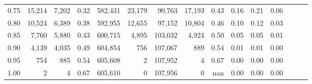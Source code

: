 \begin{tabular}{rrrrrrrrrrrrrrr}
0.75 &  15,214 &   7,202 &  0.32 &  582,431 &   23,179 &   90,763 &   17,193 &  0.43 &  0.16 &  0.21 &      0.06 \\
0.80 &  10,524 &   6,389 &  0.38 &  592,955 &   12,655 &   97,152 &   10,804 &  0.46 &  0.10 &  0.12 &      0.03 \\
0.85 &   7,760 &   5,880 &  0.43 &  600,715 &    4,895 &  103,032 &    4,924 &  0.50 &  0.05 &  0.05 &      0.01 \\
0.90 &   4,139 &   4,035 &  0.49 &  604,854 &      756 &  107,067 &      889 &  0.54 &  0.01 &  0.01 &      0.00 \\
0.95 &     754 &     885 &  0.54 &  605,608 &        2 &  107,952 &        4 &  0.67 &  0.00 &  0.00 &      0.00 \\
1.00 &       2 &       4 &  0.67 &  605,610 &        0 &  107,956 &        0 &   nan &  0.00 &  0.00 &      0.00 \\
\bottomrule
\end{tabular}
